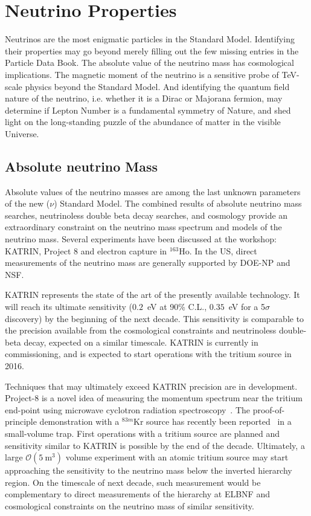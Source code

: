 \section{Neutrino Properties}
\label{sec:Properties}

Neutrinos are the most enigmatic particles in the Standard
Model. Identifying their properties may go beyond merely filling out
the few missing entries in the Particle Data Book. The absolute value
of the neutrino mass has cosmological implications. The magnetic
moment of the neutrino is a sensitive probe of TeV-scale physics
beyond the Standard Model. And identifying the quantum field nature of
the neutrino, i.e. whether it is a Dirac or Majorana fermion, may
determine if Lepton Number is a fundamental symmetry of Nature, and
shed light on the long-standing puzzle of the abundance of matter in
the visible Universe.

\subsection{Absolute neutrino Mass}

Absolute values of the neutrino masses are among the last unknown
parameters of the new ($\nu$) Standard Model. 
The combined results
of absolute neutrino mass searches,
neutrinoless double beta decay searches, and cosmology provide an
extraordinary constraint on the neutrino mass spectrum and models of the
neutrino mass.
Several experiments
have been discussed at the workshop: KATRIN, Project 8 and electron
capture in $^{163}$Ho. In the US, direct measurements of the neutrino
mass are generally supported by DOE-NP and NSF.   

KATRIN represents the state of the art of the presently available
technology. It will reach its ultimate sensitivity ($0.2$~eV at 90\%
C.L., $0.35$~eV for a 5$\sigma$ discovery) by the beginning of the
next decade. This sensitivity is comparable to the precision
available from the cosmological constraints and neutrinoless
double-beta decay, expected on a similar timescale. KATRIN is
currently in commissioning, and is expected to start operations with
the tritium source in 2016.

Techniques that may ultimately exceed KATRIN precision are in
development. Project-8 is a novel idea of measuring the momentum
spectrum near the tritium end-point using microwave cyclotron
radiation spectroscopy~\cite{Monreal:2009za}. The proof-of-principle
demonstration with a $^{83m}$Kr source has recently been
reported~\cite{Asner:2014cwa} in a small-volume trap. First operations
with a tritium source are planned and sensitivity similar to KATRIN is
possible by the end of the decade. Ultimately, a large
$\mathcal{O}(5~\mathrm{m}^3)$ volume experiment with an atomic tritium
source may start approaching the sensitivity to the neutrino mass
below the inverted hierarchy region. On the timescale of next decade,
such measurement would be complementary to direct measurements of the
hierarchy at ELBNF and cosmological constraints on the neutrino mass
of similar sensitivity.


